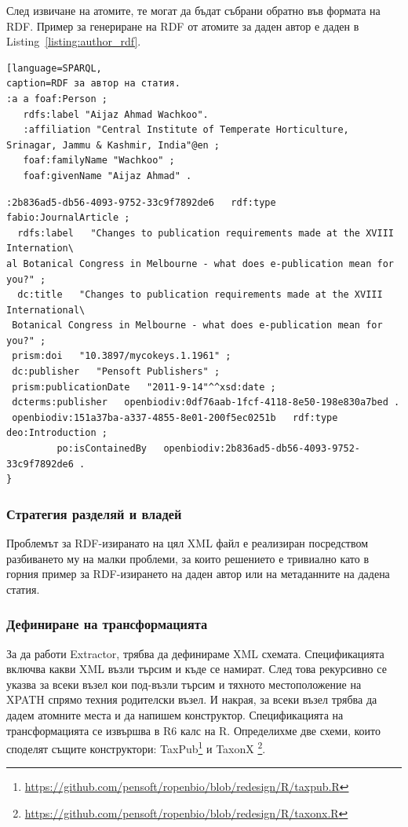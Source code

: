 След извичане на атомите, те могат да бъдат събрани обратно във формата на RDF.  Пример за генериране на RDF от атомите за даден автор е даден в Listing~\ref{listing:author_rdf}.

\begin{lstlisting}[language=SPARQL,
caption=RDF за автор на статия.
:a a foaf:Person ;
   rdfs:label "Aijaz Ahmad Wachkoo".
   :affiliation "Central Institute of Temperate Horticulture, Srinagar, Jammu & Kashmir, India"@en ;
   foaf:familyName "Wachkoo" ;
   foaf:givenName "Aijaz Ahmad" .
\end{lstlisting}

\begin{lstlisting}[language=SPARQL,
caption=Пример за RDF на метаданните на статия., label=listing:parent-node-rdf, basicstyle=\ttfamily\tiny]
:2b836ad5-db56-4093-9752-33c9f7892de6   rdf:type   fabio:JournalArticle ;
  rdfs:label   "Changes to publication requirements made at the XVIII Internation\
al Botanical Congress in Melbourne - what does e-publication mean for you?" ;
  dc:title   "Changes to publication requirements made at the XVIII International\
 Botanical Congress in Melbourne - what does e-publication mean for you?" ;
 prism:doi   "10.3897/mycokeys.1.1961" ;
 dc:publisher   "Pensoft Publishers" ;
 prism:publicationDate   "2011-9-14"^^xsd:date ;
 dcterms:publisher   openbiodiv:0df76aab-1fcf-4118-8e50-198e830a7bed .
 openbiodiv:151a37ba-a337-4855-8e01-200f5ec0251b   rdf:type   deo:Introduction ;
         po:isContainedBy   openbiodiv:2b836ad5-db56-4093-9752-33c9f7892de6 .
}
\end{lstlisting}

\subsubsection{Стратегия разделяй и владей}

Проблемът за RDF-изиранато на цял XML файл е реализиран посредством разбиването му на малки проблеми, за които решението е тривиално като в горния пример за RDF-изирането на даден автор или на метаданните на дадена статия.

\subsubsection{Дефиниране на трансформацията}

За да работи Extractor, трябва да дефинираме XML схемата. Спецификацията включва какви XML възли търсим и къде се намират. След това рекурсивно се указва за всеки възел кои под-възли търсим и тяхното местоположение на XPATH спрямо техния родителски възел. И накрая, за всеки възел трябва да дадем атомните места и да напишем конструктор. Спецификацията на трансформацията се извършва в R6 калс на R. Определихме две схеми, които споделят същите конструктори: TaxPub\footnote{\url{https://github.com/pensoft/ropenbio/blob/redesign/R/taxpub.R}} и TaxonX \footnote{\url{https://github.com/pensoft/ropenbio/blob/redesign/R/taxonx.R}}.

